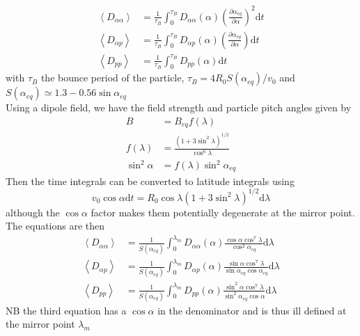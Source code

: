 \documentclass[]{article}
\begin{document}
\begin{align}\label{Bounce_time}
\left< D_{\alpha \alpha}\right> &=\frac{1}{\tau_B} \int_0^{\tau_B} D_{\alpha \alpha}(\alpha) \left(\frac{\partial \alpha_{eq}}{\partial \alpha}\right)^2 \mathrm{d}t\\
\left< D_{\alpha p}\right> &=\frac{1}{\tau_B} \int_0^{\tau_B} D_{\alpha p}(\alpha) \left(\frac{\partial \alpha_{eq}}{\partial \alpha}\right) \mathrm{d}t\\
\left< D_{p p}\right> &=\frac{1}{\tau_B} \int_0^{\tau_B} D_{p p}(\alpha) \mathrm{d}t
\end{align}
with $\tau_B$ the bounce period of the particle, $\tau_B = 4 R_0 S(\alpha_{eq})/v_0$ and $S(\alpha_{eq}) \simeq 1.3 - 0.56 \sin\alpha_{eq}$
\\Using a dipole field, we have the field strength and particle pitch angles given by
\begin{align}
B &= B_{eq} f(\lambda)\\
f(\lambda) &= \frac{(1+3\sin^2\lambda)^{1/2}}{\cos^6\lambda}\\
\sin^2\alpha &= f(\lambda) \sin^2\alpha_{eq}
\end{align}
Then the time integrals can be converted to latitude integrals using
\begin{equation}
v_0 \cos \alpha \mathrm{d} t = R_0 \cos \lambda (1+3\sin^2\lambda)^{1/2} \mathrm{d}\lambda
\end{equation}
although the $\cos \alpha$ factor makes them potentially degenerate at the mirror point. The equations are then
\begin{align}\label{Bounce_lam}
\left< D_{\alpha \alpha}\right> &=\frac{1}{S(\alpha_{eq})} \int_0^{\lambda_m} D_{\alpha \alpha}(\alpha) \frac{\cos \alpha \cos^7\lambda}{\cos^2\alpha_{eq}} \mathrm{d}\lambda\\
\left< D_{\alpha p}\right> &=\frac{1}{S(\alpha_{eq})} \int_0^{\lambda_m} D_{\alpha p}(\alpha) \frac{\sin \alpha \cos^7\lambda}{\sin \alpha_{eq}\cos\alpha_{eq}} \mathrm{d}\lambda\\
\left< D_{p p}\right> &=\frac{1}{S(\alpha_{eq})} \int_0^{\lambda_m} D_{p p}(\alpha) \frac{\sin^2 \alpha \cos^7\lambda}{\sin^2 \alpha_{eq}\cos\alpha} \mathrm{d}\lambda
\end{align}
NB the third equation has a $\cos\alpha$ in the denominator and is thus ill defined at the mirror point $\lambda_m$
\end{document}
